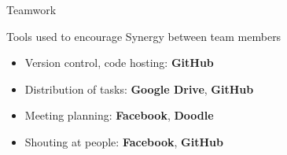 \documentclass{beamer}
\begin{document}
    \begin{frame}{Teamwork}

        Tools used to encourage Synergy\small{\texttrademark} between team members
        \begin{itemize}
            \item{Version control, code hosting: \textbf{GitHub}}
            \item{Distribution of tasks: \textbf{Google Drive}, \textbf{GitHub}}
            \item{Meeting planning: \textbf{Facebook}, \textbf{Doodle}}
            \item{Shouting at people: \textbf{Facebook}, \textbf{GitHub}}
        \end{itemize}

    \end{frame} 
\end{document}
